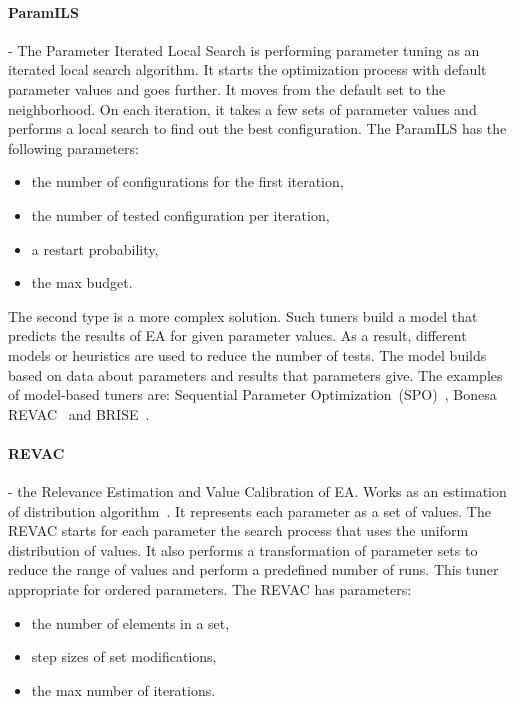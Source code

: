 \paragraph{ParamILS} - The Parameter Iterated Local Search is performing parameter tuning as an iterated local search algorithm. It starts the optimization process with default parameter values and goes further. It moves from the default set to the neighborhood. On each iteration, it takes a few sets of parameter values and performs a local search to find out the best configuration. The ParamILS has the following parameters:
\begin{itemize}
	\item the number of configurations for the first iteration,
	\item the number of tested configuration per iteration,
	\item a restart probability,
	\item the max budget.
\end{itemize}


The second type is a more complex solution. Such tuners build a model that predicts the results of EA for given parameter values. As a result, different models or heuristics are used to reduce the number of tests. The model builds based on data about parameters and results that parameters give. The examples of model-based tuners are: Sequential Parameter Optimization~(SPO)~\cite{bartz2004analysis}, Bonesa~\cite{smit2012parameter, bartz2005sequential} REVAC~\cite{nannen2007efficient} and BRISE~\cite{pukhkaiev2016, pukhkaiev19}.

\paragraph{REVAC} - the Relevance Estimation and Value Calibration of EA. Works as an estimation of distribution algorithm~\cite{pelikan2002, montero2012state}. It represents each parameter as a set of values. The REVAC starts for each parameter the search process that uses the uniform distribution of values. It also performs a transformation of parameter sets to reduce the range of values and perform a predefined number of runs. This tuner appropriate for ordered parameters. The REVAC has parameters:
\begin{itemize}
	\item the number of elements in a set,
	\item step sizes of set modifications,
	\item the max number of iterations.
\end{itemize} 

